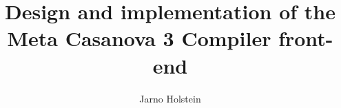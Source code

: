 \documentclass[xetex,aspectratio=169]{beamer}
\title{Design and implementation of the Meta Casanova 3 Compiler front-end }
\author{Jarno Holstein}
\begin{document}
    \frame{\titlepage}
    
%    
%    
%    
%    
\end{document}
